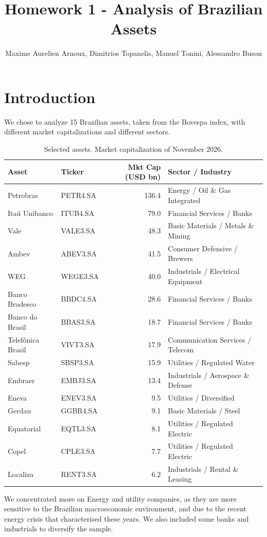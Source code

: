 \documentclass[12pt, a4paper]{article}
\title{Homework 1 - Analysis of Brazilian Assets}
\author{Maxime Aurelien Arnoux, Dimitrios Topanelis, Manuel Tonini, Alessandro Buson}
\date{}
\begin{document}
\maketitle

\section{Introduction}
We chose to analyze 15 Brazilian assets, taken from the Bovespa index, with different market capitalizations and different sectors.

\begin{table}[htbp]
\centering
\small
\begin{tabular}{|l|l|r|l|}
\hline
\textbf{Asset} & \textbf{Ticker} & \textbf{Mkt Cap (USD bn)} & \textbf{Sector / Industry} \\
\hline
Petrobras           & PETR4.SA & 136.4 & Energy / Oil \& Gas Integrated \\
Ita\'u Unibanco     & ITUB4.SA &  79.0 & Financial Services / Banks \\
Vale                & VALE3.SA &  48.3 & Basic Materials / Metals \& Mining \\
Ambev               & ABEV3.SA &  41.5 & Consumer Defensive / Brewers \\
WEG                 & WEGE3.SA &  40.0 & Industrials / Electrical Equipment \\
Banco Bradesco      & BBDC4.SA &  28.6 & Financial Services / Banks \\
Banco do Brasil     & BBAS3.SA &  18.7 & Financial Services / Banks \\
Telef\^onica Brasil & VIVT3.SA &  17.9 & Communication Services / Telecom \\
Sabesp              & SBSP3.SA &  15.9 & Utilities / Regulated Water \\
Embraer             & EMBJ3.SA &  13.4 & Industrials / Aerospace \& Defense \\
Eneva               & ENEV3.SA &   9.5 & Utilities / Diversified \\
Gerdau              & GGBR4.SA &   9.1 & Basic Materials / Steel \\
Equatorial          & EQTL3.SA &   8.1 & Utilities / Regulated Electric \\
Copel               & CPLE3.SA &   7.7 & Utilities / Regulated Electric \\
Localiza            & RENT3.SA &   6.2 & Industrials / Rental \& Leasing \\
\hline
\end{tabular}
\caption{Selected assets. Market capitalization of November 2026.}
\label{tab:asset}
\end{table}
We concentrated more on Energy and utility companies, as they are more sensitive to the Brazilian macroeconomic environment, and due to the recent energy crisis that characterised these years. We also included some banks and industrials to diversify the sample.
\end{document}
